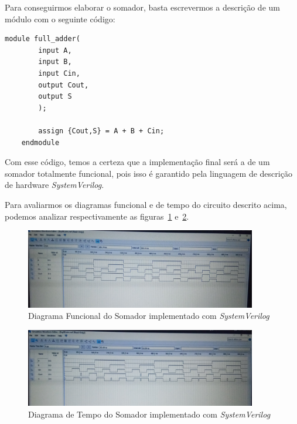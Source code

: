 \documentclass[12pt]{article}
\begin{document}
Para conseguirmos elaborar o somador, basta escrevermos a descrição de um módulo
com o seguinte código:

\begin{center}
    \begin{lstlisting}[style={verilog-style}]
    module full_adder(
        input A,
        input B,
        input Cin,
        output Cout,
        output S
        );

        assign {Cout,S} = A + B + Cin;
    endmodule
    \end{lstlisting}
    \label{code:full_adder}
\end{center}

Com esse código, temos a certeza que a implementação final será a de um somador
totalmente funcional, pois isso é garantido pela linguagem de descrição de
hardware \emph{SystemVerilog}.

Para avaliarmos os diagramas funcional e de tempo do circuito descrito acima,
podemos analizar respectivamente as figuras~\ref{fig:2_2_Functional_Foto.jpg}
e~\ref{fig:2_2_Timing_Foto.jpg}.

\begin{figure}[H]
  \centering
  \includegraphics[width=0.9\textwidth]{Exp06/Images/2_2_Functional_Foto.jpg}
  \caption{Diagrama Funcional do Somador implementado com \emph{SystemVerilog}}\label{fig:2_2_Functional_Foto.jpg}
\end{figure}

\begin{figure}[H]
  \centering
  \includegraphics[width=0.9\textwidth]{Exp06/Images/2_2_Timing_Foto.jpg}
  \caption{Diagrama de Tempo do Somador implementado com \emph{SystemVerilog}}\label{fig:2_2_Timing_Foto.jpg}
\end{figure}
\end{document}
